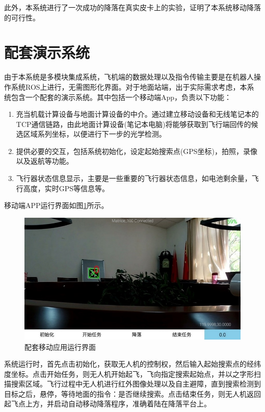 此外，本系统进行了一次成功的降落在真实皮卡上的实验，证明了本系统移动降落的可行性。 


\section{配套演示系统}

由于本系统是多模块集成系统，飞机端的数据处理以及指令传输主要是在机器人操作系统ROS上进行，无需图形化界面。对于地面站端，出于实际需求考虑，本系统包含一个配套的演示系统。其中包括一个移动端App，负责以下功能：
\begin{enumerate}[1.]
\item 充当机载计算设备与地面计算设备的中介。通过建立移动设备和无线笔记本的TCP通信链路，由此地面计算设备(笔记本电脑)将能够获取到飞行端回传的候选区域系列坐标，以便进行下一步的光学检测。
\item 提供必要的交互，包括系统初始化，设定起始搜索点(GPS坐标)，拍照，录像以及返航等功能。
\item 飞行器状态信息显示，主要是一些重要的飞行器状态信息，如电池剩余量，飞行高度，实时GPS等信息等。
\end{enumerate}

移动端APP运行界面如图\ref{配套移动应用运行界面}所示。

\begin{figure}[h]
    \centering
    \includegraphics[width=12cm]{figures/配套移动应用运行界面.jpg}
    \caption{配套移动应用运行界面}\label{配套移动应用运行界面}
\end{figure}

系统运行时，首先点击初始化，获取无人机的控制权，然后输入起始搜索点的经纬度坐标。点击开始任务，则无人机开始起飞，飞向指定搜索起始点，并以之字形扫描搜索区域。飞行过程中无人机进行红外图像处理以及自主避障，直到搜索检测到目标之后，悬停，等待地面的指令：是否继续搜索。点击结束任务，则无人机返回起飞点上方，并启动自动移动降落程序，准确着陆在降落平台上。

